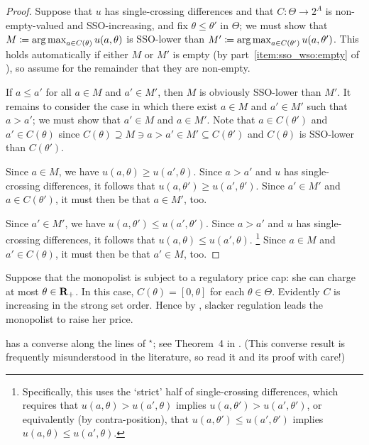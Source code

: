 \begin{proof}
	Suppose that $u$ has single-crossing differences and that $C : \Theta \to 2^A$ is non-empty-valued and SSO-increasing, and fix $\theta \leq \theta'$ in $\Theta$; we must show that $M \coloneqq \operatorname*{arg\,max}_{a \in C(\theta)} u(a,\theta)$ is SSO-lower than $M' \coloneqq \operatorname*{arg\,max}_{a \in C(\theta')} u(a,\theta')$. This holds automatically if either $M$ or $M'$ is empty (by part~\ref{item:sso_wso:empty} of ), so assume for the remainder that they are non-empty.

	If $a \leq a'$ for all $a \in M$ and $a' \in M'$, then $M$ is obviously SSO-lower than $M'$. It remains to consider the case in which there exist $a \in M$ and $a' \in M'$ such that $a > a'$; we must show that $a' \in M$ and $a \in M'$. Note that $a \in C(\theta')$ and $a' \in C(\theta)$ since $C(\theta) \supseteq M \ni a > a' \in M' \subseteq C(\theta')$ and $C(\theta)$ is SSO-lower than $C(\theta')$.

	Since $a \in M$, we have $u(a,\theta) \geq u(a',\theta)$. Since $a > a'$ and $u$ has single-crossing differences, it follows that $u(a,\theta') \geq u(a',\theta')$. Since $a' \in M'$ and $a \in C(\theta')$, it must then be that $a \in M'$, too.

	Since $a' \in M'$, we have $u(a,\theta') \leq u(a',\theta')$. Since $a > a'$ and $u$ has single-crossing differences, it follows that $u(a,\theta) \leq u(a',\theta)$.%
		\footnote{Specifically, this uses the `strict' half of single-crossing differences, which requires that $u(a,\theta) > u(a',\theta)$ implies $u(a,\theta') > u(a',\theta')$, or equivalently (by contra-position), that $u(a,\theta') \leq u(a',\theta')$ implies $u(a,\theta) \leq u(a',\theta)$.}
	Since $a \in M$ and $a' \in C(\theta)$, it must then be that $a' \in M$, too.
\end{proof}

\begin{namedthm}[\Cref*{example:monopoly} {\normalfont (continued)}.]
	\label{example:monopoly_consr}
	Suppose that the monopolist is subject to a regulatory price cap: she can charge at most $\theta \in \mathbf{R}_+$. In this case, $C(\theta) = [0,\theta]$ for each $\theta \in \Theta$. Evidently $C$ is increasing in the strong set order. Hence by , slacker regulation leads the monopolist to raise her price.
\end{namedthm}

 has a converse along the lines of \hyperref[theorem:topkis_ms_converse]{$^\star$}; see Theorem~4 in \textcite{MilgromShannon1994}. (This converse result is frequently misunderstood in the literature, so read it and its proof with care!)

